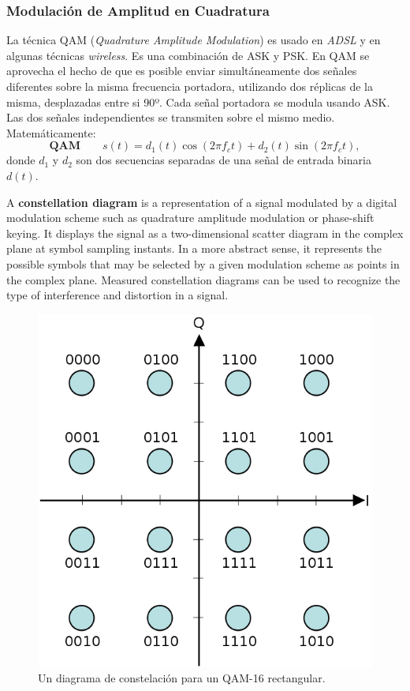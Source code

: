 \documentclass[10pt,a4paper]{article}
\begin{document}
\subsubsection{Modulación de Amplitud en Cuadratura}
La técnica QAM (\textit{Quadrature Amplitude Modulation}) es usado en \textit{ADSL} y en algunas técnicas \textit{wireless}. Es una combinación de ASK y PSK. En QAM se aprovecha el hecho de que es posible enviar simultáneamente dos señales diferentes sobre la misma frecuencia portadora, utilizando dos réplicas de la misma, desplazadas entre si 90º. Cada señal portadora se modula usando ASK. Las dos señales independientes se transmiten sobre el mismo medio. Matemáticamente:
\[\mathbf{QAM} \qquad
 s(t) = d_1(t) \cos(2\pi f_c t) + d_2(t) \sin(2\pi f_c t),
\]
donde $d_1$ y $d_2$ son dos secuencias separadas de una señal de entrada binaria $d(t)$.

A \textbf{constellation diagram} is a representation of a signal modulated by a digital modulation scheme such as quadrature amplitude modulation or phase-shift keying. It displays the signal as a two-dimensional scatter diagram in the complex plane at symbol sampling instants. In a more abstract sense, it represents the possible symbols that may be selected by a given modulation scheme as points in the complex plane. Measured constellation diagrams can be used to recognize the type of interference and distortion in a signal.

\begin{figure}[ht!]
  \caption{Un diagrama de constelación para un QAM-16 rectangular.}
  \label{fig:16qam}  
  \centerline{
	\includegraphics[width=0.5\textwidth-\fboxrule-\fboxrule]{imgs/16qam.png}}
\end{figure}
\end{document}
